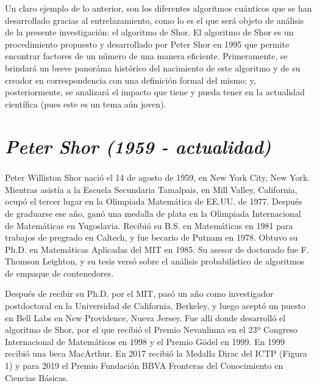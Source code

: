 \documentclass[a4paper,11pt]{article}
\begin{document}
\par Un claro ejemplo de lo anterior, son los diferentes algoritmos cuánticos que se han desarrollado gracias al entrelazamiento, como lo es el que será objeto de análisis de la presente investigación: el algoritmo de Shor. El algoritmo de Shor es un procedimiento propuesto y desarrollado por Peter Shor en 1995 que permite encontrar factores de un número de una manera eficiente. Primeramente, se brindará un breve panoráma histórico del nacimiento de este algoritmo y de su creador en correspondencia con una definición formal del mismo; y, posteriormente, se analizar\'a el impacto que tiene y pueda tener en la actualidad cient\'ifica (pues este es un tema a\'un joven).

\section*{\center\itshape\large{Peter Shor (1959 - actualidad)}}

\par Peter Williston Shor\textsuperscript{\textcolor{cyan}{\cite{1}}} naci\'o el 14 de agosto de 1959, en New York City, New York. Mientras asistía a la Escuela Secundaria Tamalpais, en Mill Valley, California, ocupó el tercer lugar en la Olimpiada Matemática de EE.UU. de 1977. Después de graduarse ese año, ganó una medalla de plata en la Olimpiada Internacional de Matemáticas en Yugoslavia. Recibi\'o su B.S. en Matemáticas en 1981 para trabajos de pregrado en Caltech, y fue becario de Putnam en 1978. Obtuvo su Ph.D. en Matemáticas Aplicadas del MIT en 1985. Su asesor de doctorado fue F. Thomson Leighton, y su tesis versó sobre el análisis probabilístico de algoritmos de empaque de contenedores.

\par Después de recibir su Ph.D. por el MIT, pasó un año como investigador postdoctoral en la Universidad de California, Berkeley, y luego aceptó un puesto en Bell Labs en New Providence, Nueva Jersey. Fue allí donde desarrolló el algoritmo de Shor, por el que recibió el Premio Nevanlinna en el 23º Congreso Internacional de Matemáticos en 1998 y el Premio Gödel en 1999. En 1999 recibió una beca MacArthur. En 2017 recibi\'o la Medalla Dirac del ICTP (Figura 1) y para 2019 el Premio Fundación BBVA Fronteras del Conocimiento en Ciencias Básicas.
\end{document}
